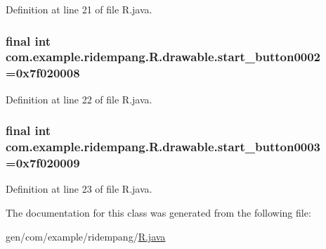 Definition at line 21 of file R.\-java.

\hypertarget{classcom_1_1example_1_1ridempang_1_1_r_1_1drawable_ab9a46e21a1ea589f648062624d158dbc}{
\subsubsection[{start\-\_\-button0002}]{\setlength{\rightskip}{0pt plus 5cm}final int com.\-example.\-ridempang.\-R.\-drawable.\-start\-\_\-button0002 =0x7f020008\hspace{0.3cm}{\ttfamily [static]}}}\label{classcom_1_1example_1_1ridempang_1_1_r_1_1drawable_ab9a46e21a1ea589f648062624d158dbc}


Definition at line 22 of file R.\-java.

\hypertarget{classcom_1_1example_1_1ridempang_1_1_r_1_1drawable_aac61d562bbbab8bbe28207ac89bc5b25}{
\subsubsection[{start\-\_\-button0003}]{\setlength{\rightskip}{0pt plus 5cm}final int com.\-example.\-ridempang.\-R.\-drawable.\-start\-\_\-button0003 =0x7f020009\hspace{0.3cm}{\ttfamily [static]}}}\label{classcom_1_1example_1_1ridempang_1_1_r_1_1drawable_aac61d562bbbab8bbe28207ac89bc5b25}


Definition at line 23 of file R.\-java.



The documentation for this class was generated from the following file\-:\begin{DoxyCompactItemize}
\item 
gen/com/example/ridempang/\hyperlink{_r_8java}{R.\-java}\end{DoxyCompactItemize}

